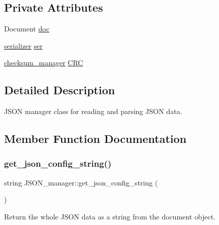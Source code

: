 \subsection*{Private Attributes}
\begin{DoxyCompactItemize}
\item 
Document \hyperlink{classJSON__manager_afa1c5569b74bd68fe785d553c798c4dd}{doc}
\item 
\hyperlink{classserializer}{serializer} \hyperlink{classJSON__manager_a0997283f905b0f2b4a58ad1ee6d678ed}{ser}
\item 
\hyperlink{classchecksum__manager}{checksum\+\_\+manager} \hyperlink{classJSON__manager_aa610a0117c11984a38dcf8ddbe9e985d}{C\+RC}
\end{DoxyCompactItemize}


\subsection{Detailed Description}
J\+S\+ON manager class for reading and parsing J\+S\+ON data. 

\subsection{Member Function Documentation}
\mbox{\label{classJSON__manager_a5d05e5f8eb6883f38181d48cf26cc5fc}} 
\subsubsection{\texorpdfstring{get\+\_\+json\+\_\+config\+\_\+string()}{get\_json\_config\_string()}}
{\footnotesize\ttfamily string J\+S\+O\+N\+\_\+manager\+::get\+\_\+json\+\_\+config\+\_\+string (\begin{DoxyParamCaption}{ }\end{DoxyParamCaption})}



Return the whole J\+S\+ON data as a string from the document object. 

\mbox{\label{classJSON__manager_a7bb6db218d195494ca939233671cb183}} 

